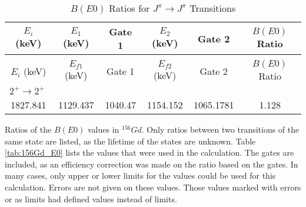 \begin{portrait}
    \begin{longtable}{c|c|c|c|c|c}
        \caption{$B(E0)$ Ratios for $J^{\pi}\rightarrow J^{\pi}$ Transitions}
        \label{tab:156Gd_BE0_Comp}\\
        \toprule
        $E_i$ (keV)	&	$E_1$ (keV)	& Gate 1 & $E_2$ (keV)	& Gate 2 &	$B(E0)$	Ratio	\\
        \hline
        \endfirsthead
        \toprule
        \caption{$B(E0)$ Ratios for $J^{\pi}\rightarrow J^{\pi}$ Transitions} \\
        $E_i$ (keV)	&	$E_{f1}$ (keV)	& Gate 1 & $E_{f2}$ (keV)	& Gate 2 &	$B(E0)$	Ratio	\\
        \hline
	    \endhead
        \multicolumn{6}{l}{$2^+\rightarrow 2^+$} 	\\ \hline
        1827.841 & 1129.437 & 1040.47 & 1154.152 & 1065.1781 & 1.128  \\
        \bottomrule
	\end{longtable}
    \item{Ratios of the $B(E0)$ values in $^{156}Gd$. Only ratios between two transitions of the same state are listed, as the lifetime of the states are unknown. Table \ref{tab:156Gd_E0} lists the values that were used in the calculation. The gates are included, as an efficiency correction was made on the ratio based on the gates. In many cases, only upper or lower limits for the values could be used for this calculation. Errors are not given on these values. Those values marked with errors or as limits had defined values instead of limits. }
\end{portrait}